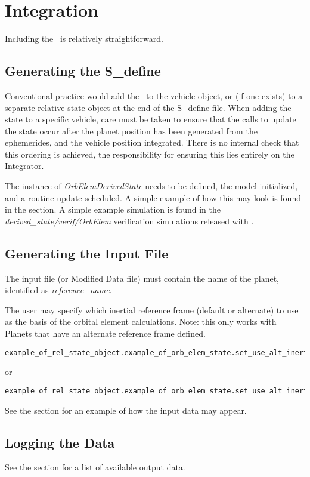%
%
% 
%


 \section{Integration}

Including the \OrbElemDesc\ is relatively straightforward.

 \subsection{Generating the S\_define}

Conventional practice would add the \OrbElemDesc\ to the vehicle object, or (if one exists) to a separate relative-state object at the end of the S\_define file.  When adding the state to a specific vehicle, care must be taken to ensure that the calls to update the state occur after the planet position has been generated from the ephemerides, and the vehicle position integrated.  There is no internal check that this ordering is achieved, the responsibility for ensuring this lies entirely on the Integrator.

The instance of \textit{OrbElemDerivedState} needs to be defined, the model initialized, and a routine update scheduled.  A simple example of how this may look is found in the  section.  A simple example simulation is found in the 
\textit{derived\_state/verif/OrbElem} verification simulations released with \JEODid.

\subsection{Generating the Input File}
The input file (or Modified Data file) must contain the name of the planet, identified as \textit{reference\_name}.

The user may specify which inertial reference frame (default or alternate) to use as the basis of the orbital element calculations. Note: this only works with Planets that have an alternate reference frame defined.
\begin{verbatim}
example_of_rel_state_object.example_of_orb_elem_state.set_use_alt_inertial(False);

\end{verbatim}
or
\begin{verbatim}
example_of_rel_state_object.example_of_orb_elem_state.set_use_alt_inertial(True);

\end{verbatim}

See the  section for an example of how the input data may appear.

\subsection{Logging the Data}
See the  section for a list of available output data.

